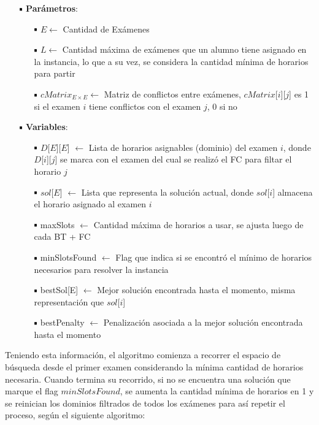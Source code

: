 \documentclass[letter, 10pt]{article}
\newcommand*\sq{\mathbin{\vcenter{\hbox{\rule{.7ex}{.7ex}}}}}
\begin{document}
\begin{itemize}
	\item[$\sq$] \textbf{Parámetros}:
	\begin{itemize}
		\item[$\sq$] $E \leftarrow$ Cantidad de Exámenes
		\item[$\sq$] $L \leftarrow$ Cantidad máxima de exámenes que un alumno tiene asignado en la instancia, lo que a su vez, se considera la cantidad mínima de horarios para partir
		\item[$\sq$] $cMatrix_{E \times E} \leftarrow$ Matriz de conflictos entre exámenes, $cMatrix$[$i$][$j$] es 1 si el examen $i$ tiene conflictos con el examen $j$, 0 si no
	\end{itemize}
	\item[$\sq$] \textbf{Variables}:
	\begin{itemize}
		\item[$\sq$] $D$[$E$][$E$] $\leftarrow$ Lista de horarios asignables (dominio) del examen $i$, donde $D$[$i$][$j$] se marca con el examen del cual se realizó el FC para filtar el horario $j$
		\item[$\sq$] $sol$[$E$] $\leftarrow$ Lista que representa la solución actual, donde $sol$[$i$] almacena el horario asignado al examen $i$
		\item[$\sq$] maxSlots $\leftarrow$ Cantidad máxima de horarios a usar, se ajusta luego de cada BT + FC
		\item[$\sq$] minSlotsFound $\leftarrow$ Flag que indica si se encontró el mínimo de horarios necesarios para resolver la instancia
		\item[$\sq$] bestSol[E] $\leftarrow$ Mejor solución encontrada hasta el momento, misma representación que $sol$[$i$]
		\item[$\sq$] bestPenalty $\leftarrow$ Penalización asociada a la mejor solución encontrada hasta el momento
	\end{itemize}
\end{itemize}

Teniendo esta información, el algoritmo comienza a recorrer el espacio de búsqueda desde el primer examen considerando la mínima cantidad de horarios necesaria. Cuando termina su recorrido, si no se encuentra una solución que marque el flag $minSlotsFound$, se aumenta la cantidad mínima de horarios en 1 y se reinician los dominios filtrados de todos los exámenes para así repetir el proceso, según el siguiente algoritmo:\\
\end{document}
